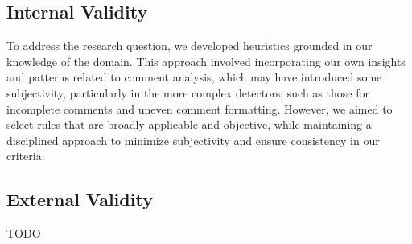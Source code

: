 \subsection{Internal Validity}
To address the research question, we developed heuristics grounded in our knowledge of the domain. This approach involved incorporating our own insights and patterns related to comment analysis, which may have introduced some subjectivity, particularly in the more complex detectors, such as those for incomplete comments and uneven comment formatting. However, we aimed to select rules that are broadly applicable and objective, while maintaining a disciplined approach to minimize subjectivity and ensure consistency in our criteria.

\subsection{External Validity}
TODO
